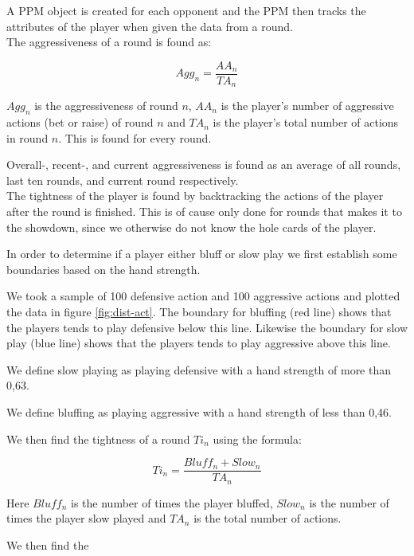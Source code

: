 A PPM object is created for each opponent and the PPM then tracks the attributes of the player when given the data from a round.\\

The aggressiveness of a round is found as:

\[Agg_{n} = \frac{AA_{n}}{TA_{n}}\]

$Agg_{n}$ is the aggressiveness of round $n$, $AA_{n}$ is the player's number of aggressive actions (bet or raise) of round $n$ and  $TA_{n}$ is the player's total number of actions in round $n$. This is found for every round. 

Overall-, recent-, and current aggressiveness is found as an average of all rounds, last ten rounds, and current round respectively.\\

The tightness of the player is found by backtracking the actions of the player after the round is finished. This is of cause only done for rounds that makes it to the showdown, since we otherwise do not know the hole cards of the player.

In order to determine if a player either bluff or slow play we first establish some boundaries based on the hand strength. 

We took a sample of 100 defensive action and 100 aggressive actions and plotted the data in figure \ref{fig:dist-act}. The boundary for bluffing (red line) shows that the players tends to play defensive below this line. Likewise the boundary for slow play (blue line) shows that the players tends to play aggressive above this line.

We define slow playing as playing defensive with a hand strength of more than 0,63.

We define bluffing as playing aggressive with a hand strength of less than 0,46.

We then find the tightness of a round $Ti_{n}$ using the formula:

\[Ti_{n} = \dfrac{Bluff_{n} + Slow_{n}}{TA_{n}}\]

Here $Bluff_{n}$ is the number of times the player bluffed, $Slow_{n}$ is the number of times the player slow played and $TA_{n}$ is the total number of actions.

We then find the 

